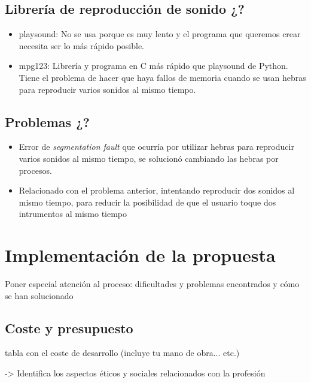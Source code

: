 \documentclass{article}
\begin{document}
 \subsection{Librería de reproducción de sonido ¿?}
 \begin{itemize}
     \item playsound\cite{playsound}: No se usa porque es muy lento y el programa que queremos crear necesita ser lo más rápido posible.
     \item mpg123\cite{mpg123}: Librería y programa en C más rápido que playsound de Python. Tiene el problema de hacer que haya fallos de memoria cuando se usan hebras para reproducir varios sonidos al mismo tiempo.
 \end{itemize}

 \subsection{Problemas ¿?}
 \begin{itemize}
     \item Error de \textit{segmentation fault} que ocurría por utilizar hebras para reproducir varios sonidos al
     mismo tiempo, se solucionó cambiando las hebras por procesos.
     \item Relacionado con el problema anterior, intentando reproducir dos sonidos al mismo tiempo,
        para reducir la posibilidad de que el usuario toque dos intrumentos al mismo tiempo
 \end{itemize}


\section{Implementación de la propuesta}\label{sec:Implementacion}

 Poner especial atención al proceso: dificultades y problemas encontrados y cómo se han solucionado

 \subsection{Coste y presupuesto}

  tabla con el coste de desarrollo (incluye tu mano de obra... etc.)

->  Identifica los aspectos éticos y sociales relacionados con la profesión
\end{document}
